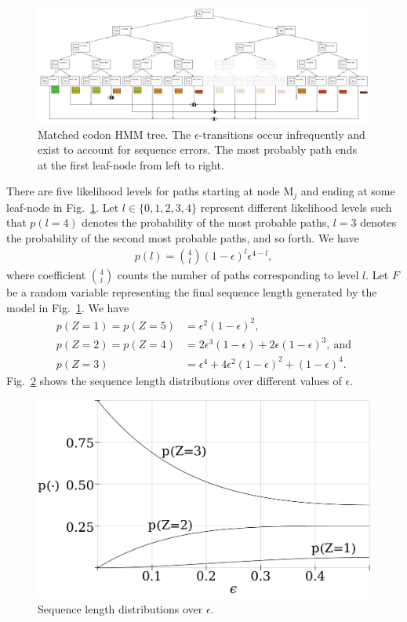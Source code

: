 \documentclass[a4paper]{article}
\theoremstyle{definition}
\theoremstyle{definition}
\newcommand{\eps}{\epsilon}
\begin{document}
\begin{figure}
    \centering
    \includegraphics[scale=0.9]{codon-hmm-tree}
    \caption{Matched codon HMM tree.
        The $\eps$-transitions occur infrequently and exist to account for sequence errors.
        The most probably path ends at the first leaf-node from left to right.}\label{fig:codon-hmm-tree}
\end{figure}

There are five likelihood levels for paths starting at node $\mathrm M_j$ and ending at some leaf-node in Fig.~\ref{fig:codon-hmm-tree}.
Let $l\in\{0, 1, 2, 3, 4\}$ represent different likelihood levels such that $p(l=4)$ denotes the probability of
the most probable paths, $l=3$ denotes the probability of the second most probable paths, and so forth.
We have
\begin{align*}
    p(l) = \binom{4}{l} (1 - \eps)^{l}\eps^{4-l},
\end{align*}
where coefficient $\binom{4}{l}$ counts the number of paths corresponding to level $l$.
Let $F$ be a random variable representing the final sequence length generated by the model in
Fig.~\ref{fig:codon-hmm-tree}.
We have
\begin{align*}
    p(Z=1) = p(Z=5) &= \eps^2(1-\eps)^2, \\
    p(Z=2) = p(Z=4) &= 2\eps^3(1-\eps) + 2\eps(1-\eps)^3,~\text{and} \\
    p(Z=3)          &= \eps^4 + 4\eps^2(1-\eps)^2 + (1-\eps)^4.
\end{align*}
Fig.~\ref{fig:seq-len-prob} shows the sequence length distributions over different values of $\eps$.

\begin{figure}[htbp]
\centering
\includegraphics[scale=0.25]{seq-len-prob}
\caption{Sequence length distributions over $\eps$.}\label{fig:seq-len-prob}
\end{figure}
\end{document}
